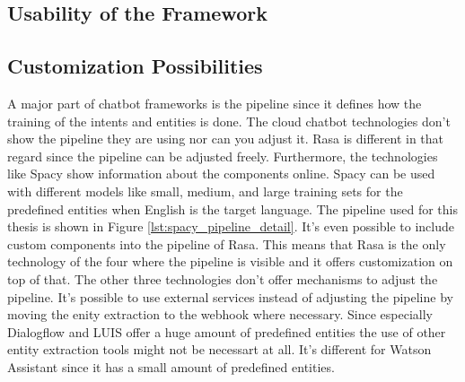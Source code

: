 \subsection*{Usability of the Framework}



\subsection*{Customization Possibilities}
A major part of chatbot frameworks is the pipeline since it defines how the 
training of the intents and entities is done.
The cloud chatbot technologies don't show the pipeline they are using nor can you 
adjust it.
Rasa is different in that regard since the pipeline can be adjusted freely.
Furthermore, the technologies like Spacy show information about the components 
online.
Spacy can be used with different models like small, medium, and large training sets 
for the predefined entities when English is the target language.
The pipeline used for this thesis is shown in Figure \ref{lst:spacy_pipeline_detail}.
It's even possible to include custom components into the pipeline of Rasa.
This means that Rasa is the only technology of the four where the pipeline is visible 
and it offers customization on top of that.
The other three technologies don't offer mechanisms to adjust the pipeline.
It's possible to use external services instead of adjusting the pipeline by 
moving the enity extraction to the webhook where necessary.
Since especially Dialogflow and LUIS offer a huge amount of predefined entities 
the use of other entity extraction tools might not be necessart at all.
It's different for Watson Assistant since it has a small amount of predefined entities.

